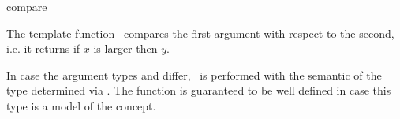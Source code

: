\begin{ccRefFunction}{compare}

\ccDefinition

The template function \ccRefName\ compares the first argument with respect to
the second, i.e. it returns  if $x$ is larger then $y$. 

In case the argument types  and  differ, 
\ccRefName\ is performed with the semantic of the type determined via
.
The function is guaranteed to be well defined in case this type
is a model of the  concept. 



\\
\\

\end{ccRefFunction}
